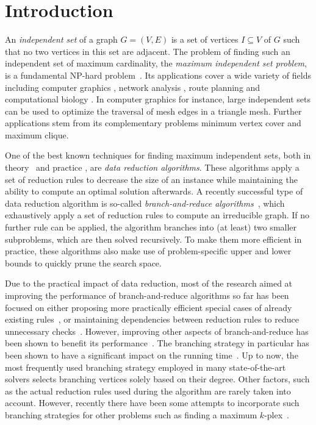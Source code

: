 \documentclass[a4paper,UKenglish,cleveref, autoref, thm-restate]{lipics-v2021}
\begin{document}
\section{Introduction}

An \emph{independent set} of a graph $G = (V,E)$ is a set of vertices $I \subseteq V$ of $G$ such that no two vertices in this set are adjacent.
The problem of finding such an independent set of maximum cardinality, the \emph{maximum independent set problem}, is a fundamental NP-hard problem~\cite{Garey1974}.
Its applications cover a wide variety of fields including computer graphics \cite{CG}, network analysis \cite{NW}, route planning \cite{RP} and computational biology \cite{BIO1, BIO2}.
In computer graphics for instance, large independent sets can be used to optimize the traversal of mesh edges in a triangle mesh.
Further applications stem from its complementary problems minimum vertex cover and maximum clique.

One of the best known techniques for finding maximum independent sets, both in
theory~\cite{XiaoNagamochi, ChenXiaKanj} and practice \cite{AkibaIwata}, are
\emph{data reduction algorithms}.
These algorithms apply a set of reduction rules to decrease the size of an instance while maintaining the ability to compute an optimal solution afterwards.
A recently successful type of data reduction algorithm is so-called
\emph{branch-and-reduce algorithms}~\cite{AkibaIwata,WGYC}, which exhaustively
apply a set of reduction rules to compute an irreducible graph.
If no further rule can be applied, the algorithm branches into (at least) two
smaller subproblems, which are then solved recursively.
To make them more efficient in practice, these algorithms also make use of problem-specific upper and lower bounds to quickly prune the search space.

Due to the practical impact of data reduction, most of the research aimed at
improving the performance of branch-and-reduce algorithms so far has been
focused on either proposing more practically efficient special cases of already
existing rules~\cite{ChangKern,dahlum2016accelerating}, or maintaining
dependencies between reduction rules to reduce unnecessary
checks~\cite{alsahafy2020computing,hespe2019scalable}.
However, improving other aspects of branch-and-reduce has been shown to benefit its performance~\cite{plachetta2021sat}.
The branching strategy in particular has been shown to have a significant impact on the running time~\cite{AkibaIwata}.
Up to now, the most frequently used branching strategy employed in many state-of-the-art solvers selects branching vertices solely based on their degree.
Other factors, such as the actual reduction rules used during the algorithm are rarely taken into account.
However, recently there have been some attempts to incorporate such branching
strategies for other problems such as finding a maximum $k$-plex~\cite{gao2018exact}.
\end{document}
